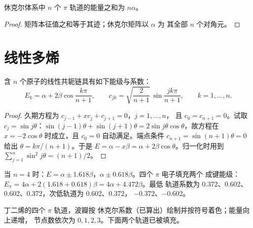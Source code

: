 \begin{proposition}[迹]\label{prop:b2:huckel:trace}
休克尔体系中 $n$ 个 $\pi$ 轨道的能量之和为 $n\alpha$。
\end{proposition}

\begin{proof}
矩阵本征值之和等于其迹；休克尔矩阵以 $\alpha$ 为
其全部 $n$ 个对角元。
\end{proof}

\section{线性多烯}

\begin{theorem}[线性链的能级]\label{thm:b2:huckel:polyene}
含 $n$ 个原子的线性共轭链具有如下能级与系数：
\[
  E_k = \alpha + 2\beta\cos\frac{k\pi}{n + 1}, \qquad
  c_{jk} = \sqrt{\frac{2}{n + 1}}\,\sin\frac{jk\pi}{n + 1}, \qquad k = 1, \dots, n .
\]
\end{theorem}

\begin{proof}
久期方程为 $c_{j-1} + xc_j + c_{j+1} = 0$，$j = 1, \dots, n$，
且 $c_0 = c_{n+1} = 0$。试取 $c_j = \sin j\theta$：$\sin(j - 1)\theta + \sin(j + 1)\theta = 2\sin
j\theta\cos\theta$，故方程在 $x = -2\cos\theta$ 时成立，且 $c_0 = 0$
自动满足。端点条件 $c_{n+1} = \sin(n + 1)\theta = 0$ 给出 $\theta =
k\pi/(n + 1)$。于是 $E = \alpha - x\beta = \alpha + 2\beta\cos\theta$。归一化时用到
$\sum_{j=1}^n\sin^2 j\theta = (n + 1)/2$。
\end{proof}

\begin{example}[丁二烯]\label{ex:b2:huckel:butadiene}
当 $n = 4$ 时：$E = \alpha \pm 1.618\beta$，$\alpha \pm 0.618\beta$。四个 $\pi$ 电子填充两个
成键能级：$E_\pi = 4\alpha + 2(1.618 + 0.618)\beta = 4\alpha + 4.472\beta$。最低
轨道系数为 0.372、0.602、0.602、0.372，次低轨道为 0.602、0.372，
$-0.372$、$-0.602$。
\end{example}

\begin{omfigure}

{\small 丁二烯的四个 $\pi$ 轨道，波瓣按
休克尔系数（已算出）绘制并按符号着色；能量向上递增，
节点数依次为 $0, 1, 2, 3$。下面两个轨道已被填充。}
\end{omfigure}

